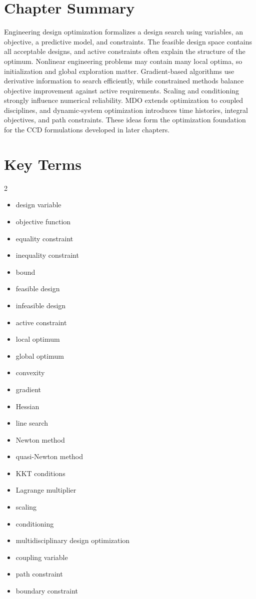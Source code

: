 \documentclass[11pt]{article}
\begin{document}
\section{Chapter Summary}

Engineering design optimization formalizes a design search using variables, an objective, a predictive model, and constraints. The feasible design space contains all acceptable designs, and active constraints often explain the structure of the optimum. Nonlinear engineering problems may contain many local optima, so initialization and global exploration matter. Gradient-based algorithms use derivative information to search efficiently, while constrained methods balance objective improvement against active requirements. Scaling and conditioning strongly influence numerical reliability. MDO extends optimization to coupled disciplines, and dynamic-system optimization introduces time histories, integral objectives, and path constraints. These ideas form the optimization foundation for the CCD formulations developed in later chapters.

\section{Key Terms}

\begin{multicols}{2}
\begin{itemize}[leftmargin=1.4em,itemsep=0.25em]
  \item design variable
  \item objective function
  \item equality constraint
  \item inequality constraint
  \item bound
  \item feasible design
  \item infeasible design
  \item active constraint
  \item local optimum
  \item global optimum
  \item convexity
  \item gradient
  \item Hessian
  \item line search
  \item Newton method
  \item quasi-Newton method
  \item KKT conditions
  \item Lagrange multiplier
  \item scaling
  \item conditioning
  \item multidisciplinary design optimization
  \item coupling variable
  \item path constraint
  \item boundary constraint
\end{itemize}
\end{multicols}
\end{document}
